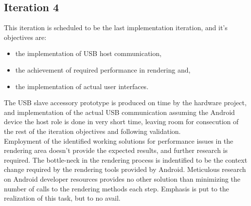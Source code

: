 		\subsection{Iteration 4}

			This iteration is scheduled to be the last implementation iteration, and it's objectives are:
			\begin{itemize} 
				\item the implementation of USB host communication,
				\item the achievement of required performance in rendering and, 
				\item the implementation of actual user interfaces.
			\end{itemize}

			The USB slave accessory prototype is produced on time by the hardware project, and implementation of the actual USB communication assuming the Android device the host role is done in very short time, leaving room for consecution of the rest of the iteration objectives and following validation.\\

			Employment of the identified working solutions for performance issues in the rendering area doesn't provide the expected results, and further research is required. The bottle-neck in the rendering process is indentified to be the context change required by the rendering tools provided by Android. Meticulous research on Android developer resources provides no other solution than minimizing the number of calls to the rendering methods each step. Emphasis is put to the realization of this task, but to no avail.\\

